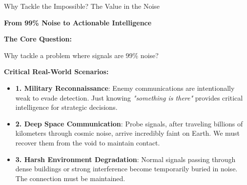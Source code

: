 \documentclass[aspectratio=169]{beamer}
\begin{document}
\begin{frame}{Why Tackle the Impossible? The Value in the Noise}
\begin{center}
\textcolor{zjutblue}{\Large \textbf{From 99\% Noise to Actionable Intelligence}}
\end{center}

\vspace{0.2cm}

\textbf{\textcolor{zjutred}{The Core Question:}}
\begin{center}
\textcolor{zjutred}{\normalsize Why tackle a problem where signals are 99\% noise?}
\end{center}

\vspace{0.2cm}

\textbf{\textcolor{zjutblue}{Critical Real-World Scenarios:}}

\begin{itemize}
\setlength{\itemsep}{0.15cm}
\item \textbf{\textcolor{zjutgreen}{1. Military Reconnaissance}}: Enemy communications are intentionally weak to evade detection. Just knowing \textit{"something is there"} provides critical intelligence for strategic decisions.

\item \textbf{\textcolor{zjutgreen}{2. Deep Space Communication}}: Probe signals, after traveling billions of kilometers through cosmic noise, arrive incredibly faint on Earth. We must recover them from the void to maintain contact.

\item \textbf{\textcolor{zjutgreen}{3. Harsh Environment Degradation}}: Normal signals passing through dense buildings or strong interference become temporarily buried in noise. The connection must be maintained.
\end{itemize}
\end{frame}
\end{document}
